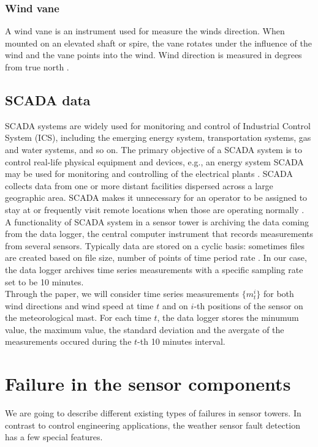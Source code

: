 \documentclass[conference]{IEEEtran}
\begin{document}
\subsubsection{Wind vane}
A wind vane is an instrument used for measure the winds direction. When mounted on an elevated shaft or spire, the vane rotates under the influence of the wind and the vane points into the wind. Wind direction is measured in degrees from true north \cite{sayigh2012comprehensive}.
\subsection{SCADA data}\label{subsec:scadaData}
SCADA systems are widely used for monitoring and control of Industrial Control System (ICS), including the emerging energy system, transportation systems, gas and water systems, and so on. The primary objective of a SCADA system is to control real-life physical equipment and devices, e.g., an energy system SCADA may be used for monitoring and controlling of the electrical plants \cite{ahmed2015investigation}. SCADA collects data from one or more distant facilities dispersed across a large geographic area. SCADA makes it unnecessary for an operator to be assigned to stay at or frequently visit remote locations when those are operating normally \cite{boyer2009scada}. \\
A functionality of SCADA system in a sensor tower is archiving the data coming from the data logger, the central computer instrument that records measurements from several sensors. Typically data are stored  on a cyclic basis: sometimes files are created based on file size, number of points of time period rate \cite{daneels1999scada}. In our case, the data logger archives time series measurements with a specific sampling rate set to be 10 minutes. \\
Through the paper, we will consider time series measurements $\{m_t^i\}$ for both wind directions and wind speed at time $t$ and on $i$-th positions of the sensor on the meteorological mast. For each time $t$, the data logger stores the minumum value, the maximum value, the standard deviation and the avergate of the measurements occured during the $t$-th 10 minutes interval.

\section{Failure in the sensor components}\label{sec:failures}
We are going to describe different existing
types of failures in sensor towers. In contrast to control engineering
applications, the weather sensor fault detection has a
few special features. %
\end{document}

